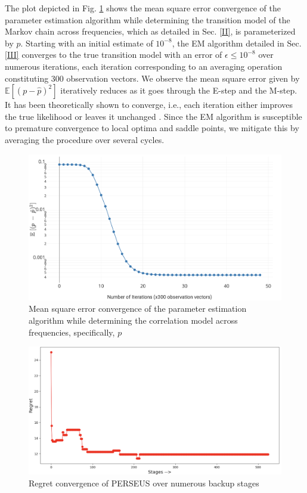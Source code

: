 \documentclass[10pt,twocolumn]{IEEEtran}
\begin{document}
The plot depicted in Fig. \ref{fig:4} shows the mean square error convergence of the parameter estimation algorithm while determining the transition model of the Markov chain across frequencies, which as detailed in Sec. \ref{II}, is parameterized by $p$. Starting with an initial estimate of $10^{-8}$, the EM algorithm detailed in Sec. \ref{III} converges to the true transition model with an error of $\epsilon{\leq}10^{-8}$ over numerous iterations, each iteration corresponding to an averaging operation constituting 300 observation vectors. We observe the mean square error given by $\mathbb{E}[(p{-}\hat{p})^{2}]$ iteratively reduces as it goes through the E-step and the M-step. It has been theoretically shown to converge, i.e., each iteration either improves the true likelihood or leaves it unchanged \cite{Neal1998}. Since the EM algorithm is susceptible to premature convergence to local optima and saddle points, we mitigate this by averaging the procedure over several cycles.
\begin{figure}
    \centering
    \includegraphics[width=0.95\linewidth]{ParameterEstimatorConvergence.png}
    \caption{Mean square error convergence of the parameter estimation algorithm while determining the correlation model across frequencies, specifically, $p$}
    \label{fig:4}
\end{figure}
\begin{figure}
    \centering
    \includegraphics[width=0.95\linewidth]{PerseusRegretConvergence.png}
    \caption{Regret convergence of PERSEUS over numerous backup stages}
    \vspace{-5mm}
    \label{fig:5}
\end{figure}
\end{document}

